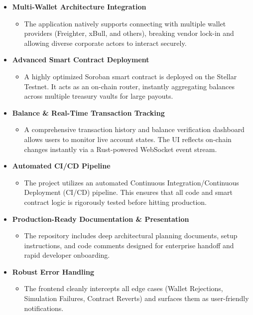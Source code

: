 \documentclass[11pt,a4paper]{article}
\begin{document}
\begin{itemize}[leftmargin=0.5cm, label=$\boxtimes$]
    \item \textbf{Multi-Wallet Architecture Integration}
    \begin{itemize}[label=$\circ$]
        \item The application natively supports connecting with multiple wallet providers (Freighter, xBull, and others), breaking vendor lock-in and allowing diverse corporate actors to interact securely.
    \end{itemize}
    \vspace{0.2cm}
    
    \item \textbf{Advanced Smart Contract Deployment}
    \begin{itemize}[label=$\circ$]
        \item A highly optimized Soroban smart contract is deployed on the Stellar Testnet. It acts as an on-chain router, instantly aggregating balances across multiple treasury vaults for large payouts.
    \end{itemize}
    \vspace{0.2cm}
    
    \item \textbf{Balance \& Real-Time Transaction Tracking}
    \begin{itemize}[label=$\circ$]
        \item A comprehensive transaction history and balance verification dashboard allows users to monitor live account states. The UI reflects on-chain changes instantly via a Rust-powered WebSocket event stream.
    \end{itemize}
    \vspace{0.2cm}
    
    \item \textbf{Automated CI/CD Pipeline}
    \begin{itemize}[label=$\circ$]
        \item The project utilizes an automated Continuous Integration/Continuous Deployment (CI/CD) pipeline. This ensures that all code and smart contract logic is rigorously tested before hitting production.
    \end{itemize}
    \vspace{0.2cm}
    
    \item \textbf{Production-Ready Documentation \& Presentation}
    \begin{itemize}[label=$\circ$]
        \item The repository includes deep architectural planning documents, setup instructions, and code comments designed for enterprise handoff and rapid developer onboarding.
    \end{itemize}
    \vspace{0.2cm}

    \item \textbf{Robust Error Handling}
    \begin{itemize}[label=$\circ$]
        \item The frontend cleanly intercepts all edge cases (Wallet Rejections, Simulation Failures, Contract Reverts) and surfaces them as user-friendly notifications.
    \end{itemize}
\end{itemize}
\end{document}
